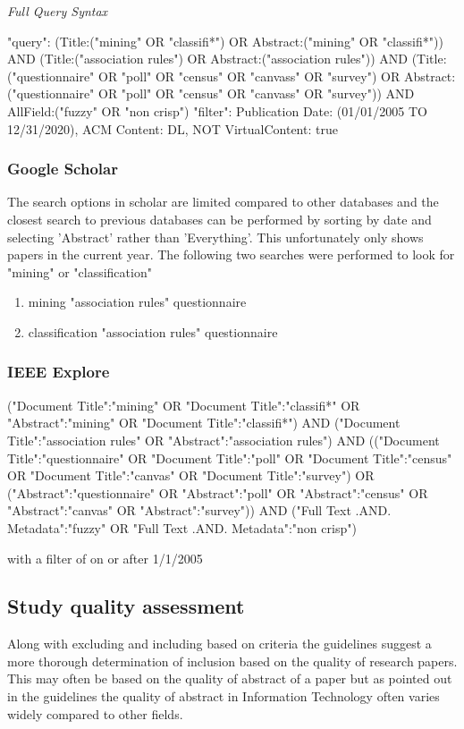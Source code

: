 \noindent
\textit{Full Query Syntax}

\noindent
"query": { (Title:("mining" OR "classifi*") OR Abstract:("mining" OR "classifi*")) AND (Title:("association rules") OR Abstract:("association rules")) AND (Title:("questionnaire" OR "poll" OR "census" OR "canvass" OR "survey") OR Abstract:("questionnaire" OR "poll" OR "census" OR "canvass" OR "survey")) AND AllField:("fuzzy" OR "non crisp") }
"filter": { Publication Date: (01/01/2005 TO 12/31/2020), ACM Content: DL, NOT VirtualContent: true }

\subsubsection{Google Scholar}
\noindent
The search options in scholar are limited compared to other databases and the closest search to previous databases can be performed by sorting by date and selecting 'Abstract' rather than 'Everything'. This unfortunately only shows papers in the current year. The following two searches were performed to look for "mining" or "classification"

\begin{enumerate}
  \item mining "association rules" questionnaire
  \item classification "association rules" questionnaire
\end{enumerate}

\subsubsection{IEEE Explore}
\noindent
("Document Title":"mining"  OR "Document Title":"classifi*" OR "Abstract":"mining" OR "Document Title":"classifi*") AND
("Document Title":"association rules" OR "Abstract":"association rules") AND
(("Document Title":"questionnaire" OR "Document Title":"poll" OR  "Document Title":"census" OR "Document Title":"canvas" OR "Document Title":"survey") OR
("Abstract":"questionnaire" OR "Abstract":"poll" OR  "Abstract":"census" OR "Abstract":"canvas" OR "Abstract":"survey"))  AND
("Full Text .AND. Metadata":"fuzzy" OR "Full Text .AND. Metadata":"non crisp")

\noindent
with a filter of on or after 1/1/2005


\subsection{Study quality assessment}

Along with excluding and including based on criteria the guidelines suggest a more thorough determination of inclusion based on the quality of research papers. This may often be based on the quality of abstract of a paper but as pointed out in the guidelines the quality of abstract in Information Technology often varies widely compared to other fields.









